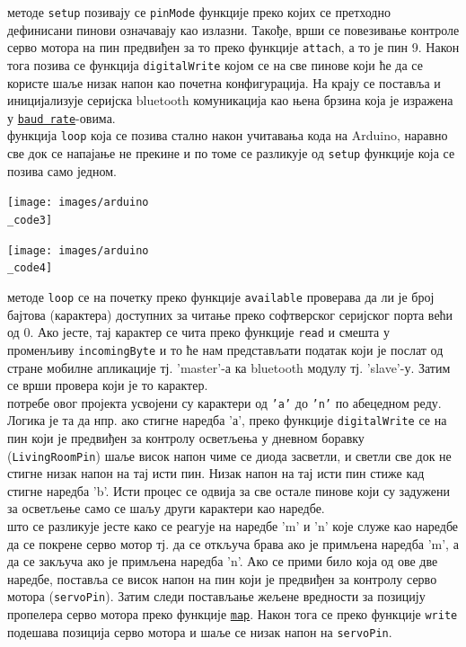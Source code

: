 \documentclass[12pt]{article}
\begin{document}
\indent{} методе \texttt{setup} позивају се \texttt{pinMode} функције преко којих се претходно дефинисани пинови означавају као излазни. Такође, врши се повезивање контроле серво мотора на пин предвиђен за то преко функције \texttt{attach}, а то је пин 9. Након тога позива се функција \texttt{digitalWrite} којом се на све пинове који ће да се користе шаље низак напон као почетна конфигурација. На крају се поставља и иницијализује серијска bluetooth комуникација као њена брзина која је изражена у \texttt{\href{https://en.wikipedia.org/wiki/Baud}{baud rate}}-овима.
\vspace{0.5cm}\\
 функција \texttt{loop} која се позива стално након учитавања кода на Arduino, наравно све док се напајање не прекине и по томе се разликује од \texttt{setup} функције која се позива само једном.
\begin{center}
    \centering 
    \texttt{[image: images/arduino\\\_code3]}
\end{center}
\begin{center}
    \centering 
    \texttt{[image: images/arduino\\\_code4]}
\end{center}
\indent{} методе \texttt{loop} се на почетку преко функције \texttt{available} проверава да ли је број бајтова (карактера) доступних за читање преко софтверског серијског порта већи од 0. Ако јесте, тај карактер се чита преко функције \texttt{read} и смешта у променљиву \texttt{incomingByte} и то ће нам представљати податак који је послат од стране мобилне апликације тј. 'master'-а ка bluetooth модулу тј. 'slave'-у. Затим се врши провера који је то карактер. \\
 потребе овог пројекта усвојени су карактери од \texttt{'а'} до \texttt{'n'} по абецедном реду. Логика је та да нпр. ако стигне наредба 'а', преко функције \texttt{digitalWrite} се на пин који је предвиђен за контролу осветљења у дневном боравку (\texttt{LivingRoomPin}) шаље висок напон чиме се диода засветли, и светли све док не стигне низак напон на тај исти пин. Низак напон на тај исти пин стиже кад стигне наредба 'b'. Исти процес се одвија за све остале пинове који су задужени за осветљење само се шаљу други карактери као наредбе.\\
 што се разликује јесте како се реагује на наредбе 'm' и 'n' које служе као наредбе да се покрене серво мотор тј. да се откључа брава ако је примљена наредба 'm', а да се закључа ако је примљена наредба 'n'. Ако се прими било која од ове две наредбе, поставља се висок напон на пин који је предвиђен за контролу серво мотора (\texttt{servoPin}). Затим следи постављање жељене вредности за позицију пропелера серво мотора преко функције \texttt{\href{https://www.arduino.cc/reference/en/language/functions/math/map/}{map}}. Након тога се преко функције \texttt{write} подешава позиција серво мотора и шаље се низак напон на \texttt{servoPin}.
\end{document}

